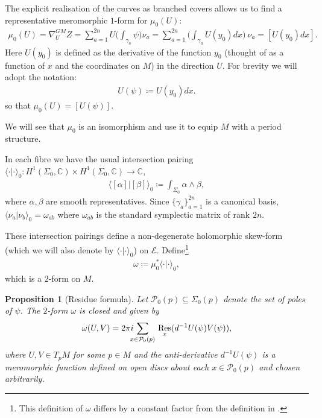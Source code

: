\documentclass[a4paper,12pt,reqno]{amsart}
\newcounter{counter2}
\numberwithin{equation}{section}
\numberwithin{counter2}{section}
\newcounter{counter3}
\newtheorem{prop}[counter2]{Proposition}
\begin{document}
The explicit realisation of the curves as branched covers allows us to find a representative meromorphic $1$-form for $\mu_0(U)$:
\begin{align}
\mu_0(U) = \nabla^{GM}_U Z = \sum_{a=1}^{2n} U\bigg( \int_{\gamma_a} \psi \bigg) \nu_a = \sum_{a=1}^{2n} \bigg( \int_{\gamma_a} U(y_0)dx \bigg) \ \nu_a = [U(y_0)dx]. 
\end{align}
Here $U(y_0)$ is defined as the derivative of the function $y_0$ (thought of as a function of $x$ and the coordinates on $M$) in the direction $U$.  
For brevity we will adopt the notation:
\begin{align}
U(\psi) \coloneqq U(y_0)dx. 
\end{align}
so that $\mu_0(U) = [U(\psi)]$.  \par
We will see that $\mu_0$ is an isomorphism and use it to equip $M$ with a period structure.  \par 
In each fibre we have the usual intersection pairing $\langle \cdot | \cdot \rangle_0 : H^1(\Sigma_0,\mathbb{C}) \times H^1(\Sigma_0,\mathbb{C}) \to \mathbb{C}$,  
\begin{align}
\langle [\alpha] | [\beta] \rangle_0 \coloneqq \int_{\Sigma_0} \alpha \wedge \beta,  
\end{align}
where $\alpha, \beta$ are smooth representatives.  Since $\{\gamma_{a}\}_{a=1}^{2n}$ is a canonical basis,  $\langle \nu_{a} | \nu_{b} \rangle_0 = \omega_{ab}$ where $\omega_{ab}$ is the standard symplectic matrix of rank $2n$. \par 
These intersection pairings define a non-degenerate holomorphic skew-form (which we will also denote by $\langle \cdot | \cdot \rangle_0$) on $\mathcal{E}$.  Define\footnote{This definition of $\omega$ differs by a constant factor from the definition in \cite{DM24}.}
\begin{align}
\omega \coloneqq \mu_0^*\langle \cdot | \cdot \rangle_0,  
\end{align}
which is a $2$-form on $M$.  
\begin{prop}[Residue formula]\label{residue_formula_prop} Let $\mathcal{P}_0(p) \subseteq \Sigma_0(p)$ denote the set of poles of $\psi$.  The $2$-form
$\omega$ is closed and given by 
\begin{align}\label{intersection_residue}
\omega(U,V) = 2\pi i \hspace{-2mm} \sum_{x \in \mathcal{P}_0(p)} \,  \underset{x}{\operatorname{Res}}( d^{-1} U(\psi)V(\psi)),  
\end{align}
where $U,V \in T_pM$ for some $p \in M$ and the anti-derivative $d^{-1}U(\psi)$ is a meromorphic function defined on open discs about each $x \in \mathcal{P}_0(p)$ and chosen arbitrarily. 
\end{prop}
\end{document}

